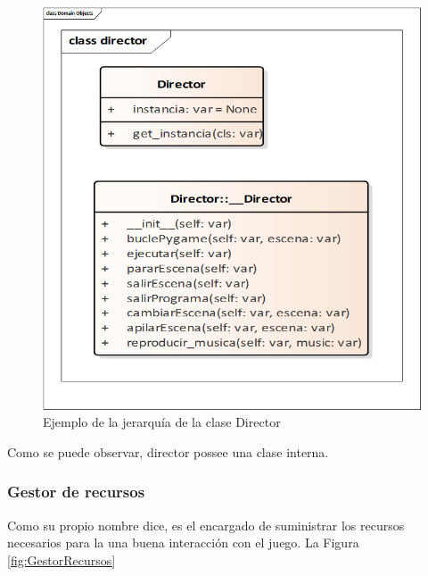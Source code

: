 \begin{figure}[H]
	\centering
	\includegraphics[scale=0.30]{imagenes/Director.png}
	\caption{\label{fig:Director}Ejemplo de la jerarquía de la clase Director}
\end{figure}

Como se puede observar, director possee una clase interna.

\subsubsection{Gestor de recursos}
Como su propio nombre dice, es el encargado de suministrar los recursos necesarios para la una buena interacción con el juego. La Figura \ref{fig:GestorRecursos}

